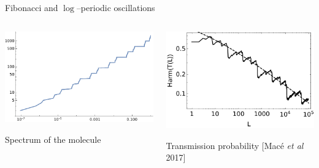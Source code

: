 \documentclass[xcolor=x11names,compress,professionalfonts]{beamer}
\renewcommand{\(}{\begin{columns}}
\renewcommand{\)}{\end{columns}}
\newcommand{\<}[1]{\begin{column}{#1}}
\renewcommand{\>}{\end{column}}
\begin{document}
\begin{frame}{Fibonacci and $\log$--periodic oscillations}
		\centering
		\begin{tikzpicture}[scale=.7]
	
	\end{tikzpicture}

	\begin{columns}
	\begin{column}{0.5\textwidth}
	{\centering
    	\includegraphics[width=\columnwidth]{idoslog.pdf}
    	
    	    	    	\scriptsize
		Spectrum of the molecule
    	
    }
    \end{column}
    \begin{column}{0.5\textwidth}
	{\centering
    	\includegraphics[width=\columnwidth]{harmonic_mean_transmission}
    	
    	    	\scriptsize
		Transmission probability
		[Macé \emph{et al} 2017]
			
    }
    \end{column}
    \end{columns}
\end{frame}
\end{document}
